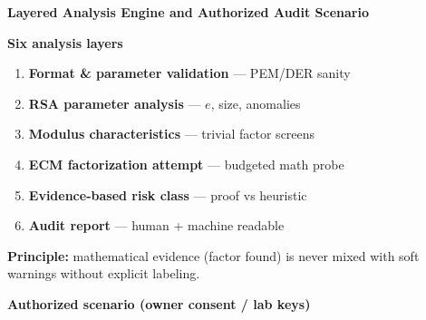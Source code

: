 \documentclass[12pt,landscape]{article}
\newcommand{\slidetitle}[1]{{\LARGE\bfseries\color{ink}#1}\par\vspace{2pt}{\color{cyan}\hrule height 1.4pt}\vspace{6pt}}
\newenvironment{slidepage}{%
  \noindent\begin{minipage}[t][\dimexpr\textheight-0.35cm\relax][s]{\textwidth}%
}{\end{minipage}\newpage}
\begin{document}
\begin{slidepage}
\slidetitle{Layered Analysis Engine and Authorized Audit Scenario}
\begin{minipage}[t]{0.48\textwidth}
{\large\bfseries\color{cyan}Six analysis layers}
\begin{enumerate}\normalsize
  \item \textbf{Format \& parameter validation} --- PEM/DER sanity
  \item \textbf{RSA parameter analysis} --- $e$, size, anomalies
  \item \textbf{Modulus characteristics} --- trivial factor screens
  \item \textbf{ECM factorization attempt} --- budgeted math probe
  \item \textbf{Evidence-based risk class} --- proof vs heuristic
  \item \textbf{Audit report} --- human + machine readable
\end{enumerate}
\vspace{\fill}
{\normalsize\color{violet}\textbf{Principle:} mathematical evidence (factor found) is never mixed with soft warnings without explicit labeling.}
\vspace{\fill}
\end{minipage}\hfill
\begin{minipage}[t]{0.48\textwidth}
\centering
{\normalsize\color{muted}\textbf{Authorized scenario (owner consent / lab keys)}}\\[0.3em]
\end{minipage}
\end{slidepage}
\end{document}
